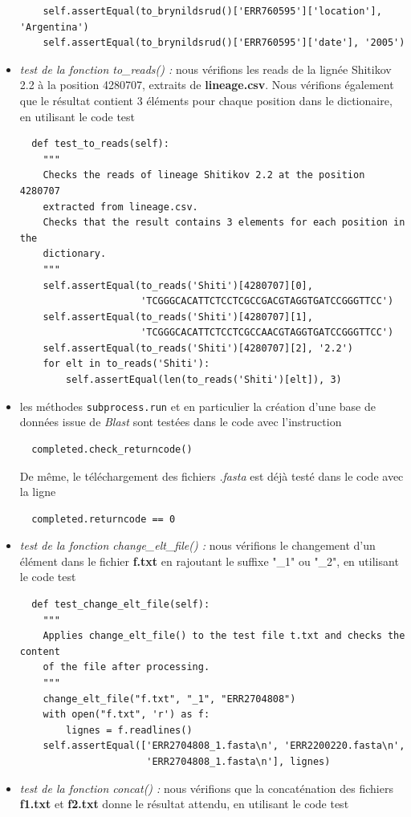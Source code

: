 \documentclass[twoside,a4paper,11pt,frenchb,openany]{report}
\begin{document}
\begin{itemize}
\begin{verbatim}
    self.assertEqual(to_brynildsrud()['ERR760595']['location'], 'Argentina')
    self.assertEqual(to_brynildsrud()['ERR760595']['date'], '2005')
\end{verbatim}
\item \textit{test de la fonction to\_reads() :} nous vérifions les reads de la lignée Shitikov 2.2 à la position 4280707, extraits de \textbf{lineage.csv}. Nous vérifions également que le résultat contient 3 éléments pour chaque position dans le dictionaire, en utilisant le code test
\begin{verbatim}
  def test_to_reads(self):
    """
    Checks the reads of lineage Shitikov 2.2 at the position 4280707
    extracted from lineage.csv.
    Checks that the result contains 3 elements for each position in the
    dictionary.
    """
    self.assertEqual(to_reads('Shiti')[4280707][0],
                     'TCGGGCACATTCTCCTCGCCGACGTAGGTGATCCGGGTTCC')
    self.assertEqual(to_reads('Shiti')[4280707][1],
                     'TCGGGCACATTCTCCTCGCCAACGTAGGTGATCCGGGTTCC')
    self.assertEqual(to_reads('Shiti')[4280707][2], '2.2')
    for elt in to_reads('Shiti'):
        self.assertEqual(len(to_reads('Shiti')[elt]), 3)
\end{verbatim}
\item les méthodes \texttt{subprocess.run} et en particulier la création d'une base de données issue de \textit{Blast} sont testées dans le code avec l'instruction 
\begin{verbatim}
  completed.check_returncode()
\end{verbatim}
De même, le téléchargement des fichiers \textit{.fasta} est déjà testé dans le code avec la ligne 
\begin{verbatim}  
  completed.returncode == 0
\end{verbatim}
\item \textit{test de la fonction change\_elt\_file() :} nous vérifions le changement d'un élément dans le fichier \textbf{f.txt} en rajoutant le suffixe "\_1" ou "\_2", en utilisant le code test
\begin{verbatim}
  def test_change_elt_file(self):
    """
    Applies change_elt_file() to the test file t.txt and checks the content
    of the file after processing.
    """
    change_elt_file("f.txt", "_1", "ERR2704808")
    with open("f.txt", 'r') as f:
        lignes = f.readlines()
    self.assertEqual(['ERR2704808_1.fasta\n', 'ERR2200220.fasta\n',
                      'ERR2704808_1.fasta\n'], lignes)
\end{verbatim}
\item \textit{test de la fonction concat() :} nous vérifions que la concaténation des fichiers \textbf{f1.txt} et \textbf{f2.txt} donne le résultat attendu, en utilisant le code test

\end{itemize}
\end{document}
